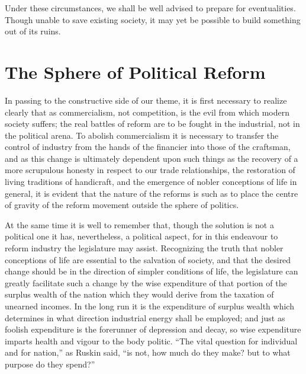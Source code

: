 \documentclass{book}
\begin{document}
Under these circumstances, we shall be well advised to prepare for eventualities. Though unable to save existing society, it may yet be possible to build something out of its ruins.

\chapter{The Sphere of Political Reform}
\label{chapter-3}
In passing to the constructive side of our theme, it is first necessary to realize clearly that as commercialism, not competition, is the evil from which modern society suffers; the real battles of reform are to be fought in the industrial, not in the political arena. To abolish commercialism it is necessary to transfer the control of industry from the hands of the financier into those of the craftsman, and as this change is ultimately dependent upon such things as the recovery of a more scrupulous honesty in respect to our trade relationships, the restoration of living traditions of handicraft, and the emergence of nobler conceptions of life in general, it is evident that the nature of the reforms is such as to place the centre of gravity of the reform movement outside the sphere of politics.

At the same time it is well to remember that, though the solution is not a political one it has, nevertheless, a political aspect, for in this endeavour to reform industry the legislature may assist. Recognizing the truth that nobler conceptions of life are essential to the salvation of society, and that the desired change should be in the direction of simpler conditions of life, the legislature can greatly facilitate such a change by the wise expenditure of that portion of the surplus wealth of the nation which they would derive from the taxation of unearned incomes. In the long run it is the expenditure of surplus wealth which determines in what direction industrial energy shall be employed; and just as foolish expenditure is the forerunner of depression and decay, so wise expenditure imparts health and vigour to the body politic. “The vital question for individual and for nation,” as Ruskin said, “is not, how much do they make? but to what purpose do they spend?”
\end{document}
